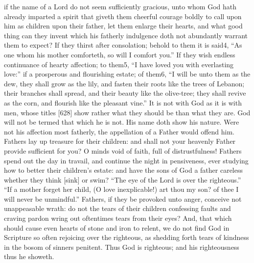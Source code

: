 if the name of a Lord do not seem sufficiently gracious, unto whom God hath already imparted a spirit that giveth them cheerful courage boldly to call upon him as children upon their father, let them enlarge their hearts, and what good thing can they invent which his fatherly indulgence doth not abundantly warrant them to expect? If they thirst after consolation; behold to them it is said4, “As one whom his mother comforteth, so will I comfort you.” If they wish endless continuance of hearty affection; to them5, “I have loved you with everlasting love:” if a prosperous and flourishing estate; of them6, “I will be unto them as the dew, they shall grow as the lily, and fasten their roots like the trees of Lebanon; their branches shall spread, and their beauty like the olive-tree; they shall revive as the corn, and flourish like the pleasant vine.” It is not with God as it is with men, whose titles [628] show rather what they should be than what they are. God will not be termed that which he is not. His name doth show his nature. Were not his affection most fatherly, the appellation of a Father would offend him. Fathers lay up treasure for their children: and shall not your heavenly Father provide sufficient for you? O minds void of faith, full of distrustfulness! Fathers spend out the day in travail, and continue the night in pensiveness, ever studying how to better their children’s estate: and have the sons of God a father careless whether they think [sink] or swim? “The eye of the Lord is over the righteous.” “If a mother forget her child, (O love inexplicable!) art thou my son? of thee I will never be unmindful.” Fathers, if they be provoked unto anger, conceive not unappeasable wrath: do not the tears of their children confessing faults and craving pardon wring out oftentimes tears from their eyes? And, that which should cause even hearts of stone and iron to relent, we do not find God in Scripture so often rejoicing over the righteous, as shedding forth tears of kindness in the bosom of sinners penitent. Thus God is righteous; and his righteousness thus he showeth.

